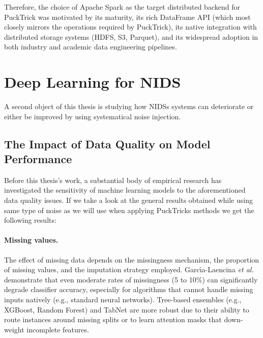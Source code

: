 \documentclass[../main.tex]{subfiles}
\begin{document}
Therefore, the choice of Apache Spark as the target distributed backend for PuckTrick was
motivated by its maturity, its rich DataFrame API (which most closely mirrors
the operations required by PuckTrick), its native integration with distributed
storage systems (HDFS, S3, Parquet), and its widespread adoption in both
industry and academic data engineering pipelines.






\newpage
\section{Deep Learning for NIDS}
\label{sec:nids-dl}

A second object of this thesis is studying how NIDSs systems can deteriorate or either be improved by using systematical noise injection. 


\subsection{The Impact of Data Quality on Model Performance}
\label{sec:dq-impact}

Before this thesis's work, a substantial body of empirical research has investigated the sensitivity of machine learning models to the aforementioned data quality issues. 
If we take a look at the general results obtained while using same type of noise as we will use when applying PuckTricks methods we get the following results: 

\paragraph{Missing values.}
The effect of missing data depends on the missingness mechanism, the proportion
of missing values, and the imputation strategy employed.
Garc\'{\i}a-Laencina \emph{et al.}~\supercite{garciaLaencina2010pattern} demonstrate
that even moderate rates of missingness (5 to 10\%) can significantly degrade
classifier accuracy, especially for algorithms that cannot handle missing inputs
natively (e.g., standard neural networks).  Tree-based ensembles (e.g., XGBoost,
Random Forest) and TabNet are more robust due to their ability to route
instances around missing splits or to learn attention masks that down-weight
incomplete features.
\end{document}
